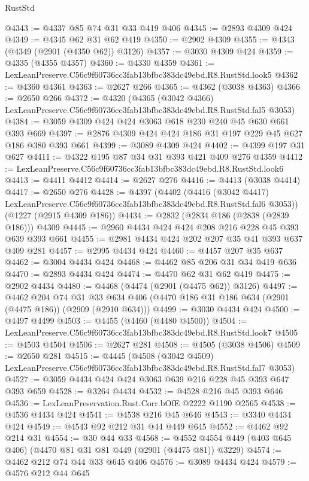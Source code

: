 \begin{lexlean}{RustStd}
\begin{coremodule}
@4343 := @4337 @85 @74 @31 @33 @419 @406
@4345 := @2893 @4309 @424
@4349 := @4345 @62 @31 @62 @419
@4350 := @2902 @4309
@4355 := @4343 (@4349 (@2901 (@4350 @62)) @3126)
@4357 := @3030 @4309 @424
@4359 := @4335 (@4355 @4357)
@4360 := @4330 @4359
@4361 := LexLeanPreserve.C56c9f60736cc3fab13bfbc383dc49ebd.R8.RustStd.look5
@4362 := @4360 @4361
@4363 := @2627 @266
@4365 := @4362 (@3038 @4363)
@4366 := @2650 @266
@4372 := @4320
    (@4365 (@3042 @4366) LexLeanPreserve.C56c9f60736cc3fab13bfbc383dc49ebd.R8.RustStd.fal5 @3053)
@4384 := @3059 @4309 @424 @424 @3063 @618 @230 @240 @45 @630 @661 @393 @669
@4397 := @2876 @4309 @424 @424 @186 @31 @197 @229 @45 @627 @186 @380 @393 @661
@4399 := @3089 @4309 @424
@4402 := @4399 @197 @31 @627
@4411 := @4322 @195 @87 @34 @31 @393 @421 @409 @276 @4359
@4412 := LexLeanPreserve.C56c9f60736cc3fab13bfbc383dc49ebd.R8.RustStd.look6
@4413 := @4411 @4412
@4414 := @2627 @276
@4416 := @4413 (@3038 @4414)
@4417 := @2650 @276
@4428 := @4397
    (@4402
      (@4416 (@3042 @4417) LexLeanPreserve.C56c9f60736cc3fab13bfbc383dc49ebd.R8.RustStd.fal6 @3053))
    (@1227 (@2915 @4309 @186))
@4434 := @2832 (@2834 @186 (@2838 (@2839 @186))) @4309
@4445 := @2960 @4434 @424 @424 @208 @216 @228 @45 @393 @639 @393 @661
@4455 := @2981 @4434 @424 @202 @207 @35 @41 @393 @637 @409 @281
@4457 := @2995 @4434 @424
@4460 := @4457 @207 @35 @637
@4462 := @3004 @4434 @424
@4468 := @4462 @85 @206 @31 @34 @419 @636
@4470 := @2893 @4434 @424
@4474 := @4470 @62 @31 @62 @419
@4475 := @2902 @4434
@4480 := @4468 (@4474 (@2901 (@4475 @62)) @3126)
@4497 := @4462
    @204
    @74
    @31
    @33
    @634
    @406
    (@4470 @186 @31 @186 @634 (@2901 (@4475 @186)) (@2909 (@2910 @634)))
@4499 := @3030 @4434 @424
@4500 := @4497 @4499
@4503 := @4455 (@4460 (@4480 @4500))
@4504 := LexLeanPreserve.C56c9f60736cc3fab13bfbc383dc49ebd.R8.RustStd.look7
@4505 := @4503 @4504
@4506 := @2627 @281
@4508 := @4505 (@3038 @4506)
@4509 := @2650 @281
@4515 := @4445
    (@4508 (@3042 @4509) LexLeanPreserve.C56c9f60736cc3fab13bfbc383dc49ebd.R8.RustStd.fal7 @3053)
@4527 := @3059 @4434 @424 @424 @3063 @639 @216 @228 @45 @393 @647 @393 @659
@4528 := @3264 @4434
@4532 := @4528 @216 @45 @393 @646
@4536 := LexLeanPreservation.Rust.Corr.bOfE @2222 @1190 @2565
@4538 := @4536 @4434 @424
@4541 := @4538 @216 @45 @646
@4543 := @3340 @4434 @424
@4549 := @4543 @92 @212 @31 @44 @449 @645
@4552 := @4462 @92 @214 @31
@4554 := @30 @44 @33
@4568 := @4552 @4554 @449 (@403 @645 @406) (@4470 @81 @31 @81 @449 (@2901 (@4475 @81)) @3229)
@4574 := @4462 @212 @74 @44 @33 @645 @406
@4576 := @3089 @4434 @424
@4579 := @4576 @212 @44 @645

\end{coremodule}
\end{lexlean}
